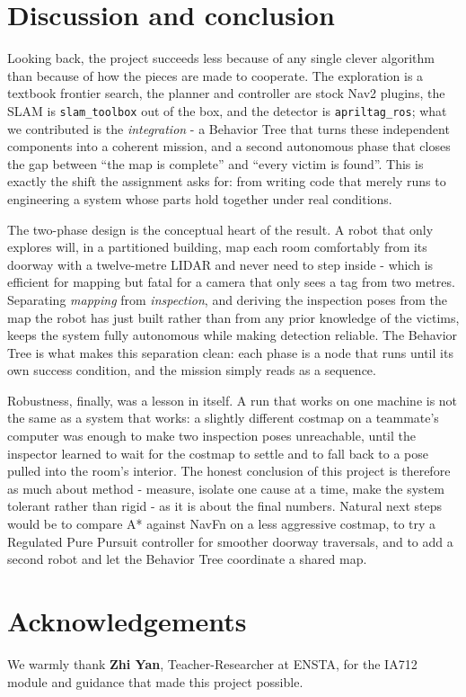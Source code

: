 \documentclass[11pt,a4paper]{article}
\begin{document}
\section{Discussion and conclusion}
Looking back, the project succeeds less because of any single clever algorithm than because of how the
pieces are made to cooperate. The exploration is a textbook frontier search, the planner and controller
are stock Nav2 plugins, the SLAM is \texttt{slam\_toolbox} out of the box, and the detector is
\texttt{apriltag\_ros}; what we contributed is the \emph{integration} - a Behavior Tree that turns
these independent components into a coherent mission, and a second autonomous phase that closes the gap
between ``the map is complete'' and ``every victim is found''. This is exactly the shift the assignment
asks for: from writing code that merely runs to engineering a system whose parts hold together under
real conditions.

The two-phase design is the conceptual heart of the result. A robot that only explores will, in a
partitioned building, map each room comfortably from its doorway with a twelve-metre LIDAR and never
need to step inside - which is efficient for mapping but fatal for a camera that only sees a tag from
two metres. Separating \emph{mapping} from \emph{inspection}, and deriving the inspection poses from the
map the robot has just built rather than from any prior knowledge of the victims, keeps the system
fully autonomous while making detection reliable. The Behavior Tree is what makes this separation clean:
each phase is a node that runs until its own success condition, and the mission simply reads as a
sequence.

Robustness, finally, was a lesson in itself. A run that works on one machine is not the same as a system
that works: a slightly different costmap on a teammate's computer was enough to make two inspection poses
unreachable, until the inspector learned to wait for the costmap to settle and to fall back to a pose
pulled into the room's interior. The honest conclusion of this project is therefore as much about method
- measure, isolate one cause at a time, make the system tolerant rather than rigid - as it is about
the final numbers. Natural next steps would be to compare A* against NavFn on a less aggressive costmap,
to try a Regulated Pure Pursuit controller for smoother doorway traversals, and to add a second robot
and let the Behavior Tree coordinate a shared map.

\section*{Acknowledgements}
We warmly thank \textbf{Zhi Yan}, Teacher-Researcher at ENSTA, for the IA712 module and guidance that
made this project possible.
\end{document}

